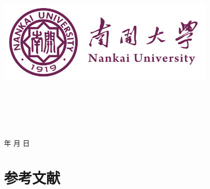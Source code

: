 \documentclass[a4paper]{article}
\newcommand{\HRule}{\rule{\linewidth}{0.5mm}}%
\begin{document}
\renewcommand{\contentsname}{目\ 录}
\renewcommand{\appendixname}{附录}
\renewcommand{\appendixpagename}{附录}
\renewcommand{\refname}{参考文献}
\renewcommand{\figurename}{图}
\renewcommand{\tablename}{表}
\renewcommand{\today}{\number\year 年 \number\month 月 \number\day 日}

\begin{titlepage}
  \begin{center}
    \includegraphics[width=0.8\textwidth]{NKU.png}\\[1cm]
    \vspace{20mm}
    \textbf{\huge\textbf{}}\\[0.5cm]
    \textbf{\huge{}}\\[2.3cm]
    \textbf{\Huge\textbf{}}

    \vspace{\fill}

    \centering
    \textsc{\LARGE {}}\\[0.5cm]
    \textsc{\LARGE {}}\\[0.5cm]
    \textsc{\LARGE {}}\\[0.5cm]

    \vfill
    {\Large \today}
  \end{center}
\end{titlepage}

\renewcommand {\thefigure}{\thesection{}.\arabic{figure}}%
\renewcommand{\figurename}{图}
\renewcommand{\contentsname}{目录}


\clearpage
\tableofcontents
\newpage

\newpage

\section{参考文献}
\cite{1}\cite{2}\cite{3}\cite{4}\cite{5}\cite{6}



\end{document}
